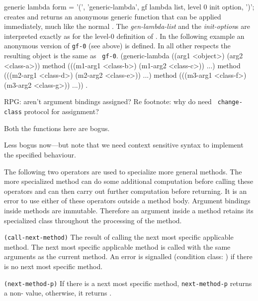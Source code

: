 \begin{optDefinition}
\Syntax
\savesyntax\genericLambdaSyntax\vbox{\small\syntax
generic lambda form
   = '(', 'generic-lambda', gf lambda list,
     {level 0 init option}, ')';
\endsyntax}
%
\remarks%
 creates and returns an anonymous generic function that
can be applied immediately, much like the normal .  The {\em
    gen-lambda-list} and the {\em init-option\/}s are interpreted exactly as for
the level-0 definition of .  \examples In the following
example an anonymous version of {\tt gf-0} (see  above)
is defined.  In all other respects the resulting object is the same as {\tt
    gf-0}.
%
{\small\syntax
(generic-lambda ((arg1 <object>) (arg2 <class-a>))
  method (((m1-arg1 <class-b>) (m1-arg2 <class-c>)) ...)
  method (((m2-arg1 <class-d>) (m2-arg2 <class-e>)) ...)
  method (((m3-arg1 <class-f>) (m3-arg2 <class-g>)) ...))
\endsyntax}
%
\seealso%
.
%
\end{optDefinition}

%
\begin{optPrivate}
    RPG: aren't argument bindings assigned?  Re footnote: why do need {\tt
        change-class} protocol for assignment?

    Both the functions here are bogus.

    Less bogus now---but note that we need context sensitive syntax to implement
    the specified behaviour.
\end{optPrivate}
%
\begin{optDefinition}
The following two operators are used to specialize more general methods.  The
more specialized method can do some additional computation before calling these
operators and can then carry out further computation before returning.  It is an
error to use either of these operators outside a method body.  Argument bindings
inside methods are immutable.  Therefore an
argument inside a method retains its specialized class throughout the processing
of the method.

\Syntax
\noindent
{\tt (call-next-method)}
%
\result%
The result of calling the next most specific applicable method.
%
\remarks%
The next most specific applicable method is called with the same
arguments as the current method.  An error is signalled (condition
class: {\tt <no-next-method>}) if there
is no next most specific method.

\Syntax
\noindent
{\tt (next-method-p)}
%
\result%
If there is a next most specific method, {\tt next-method-p} returns
a non-\nil\/ value, otherwise, it returns \nil.
%
\end{optDefinition}

